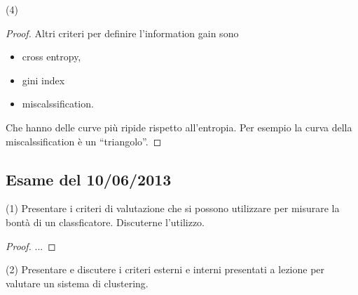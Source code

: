 \documentclass[12pt,a4paper,oneside]{book}
\begin{document}
\begin{exercise}{(4)}
\begin{proof}
        Altri criteri per definire l'information gain sono
        \begin{itemize}
            \item cross entropy,
            \item gini index
            \item miscalssification.
        \end{itemize}
        Che hanno delle curve più ripide rispetto all'entropia. Per
        esempio la curva della miscalssification è un ``triangolo''.
    \end{proof}
\end{exercise}

\subsection{Esame del 10/06/2013}

\begin{exercise}{(1)}
    Presentare i criteri di valutazione che si possono utilizzare per
    misurare la bontà di un classficatore. Discuterne l'utilizzo.
    
    \begin{proof}
    	...
    \end{proof}
\end{exercise}

\begin{exercise}{(2)}
    Presentare e discutere i criteri esterni e interni presentati a
    lezione per valutare un sistema di clustering.
\end{exercise}
\end{document}
